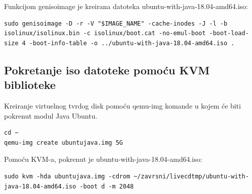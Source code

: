 \documentclass[12pt,vi]{mitthesis}
\begin{document}
\noindent
Funkcijom genisoimage je kreirana datoteka ubuntu-with-java-18.04-amd64.iso:
\begin{lstlisting}[style=BashInputStyle]
sudo genisoimage -D -r -V "$IMAGE_NAME" -cache-inodes -J -l -b isolinux/isolinux.bin -c isolinux/boot.cat -no-emul-boot -boot-load-size 4 -boot-info-table -o ../ubuntu-with-java-18.04-amd64.iso .
\end{lstlisting}

\subsection*{Pokretanje iso datoteke pomoću KVM biblioteke}
\indent
Kreiranje virtuelnog tvrdog disk pomoću qemu-img komande u kojem će biti pokrenut modul Java Ubuntu.
\begin{lstlisting}[style=BashInputStyle]
cd ~
qemu-img create ubuntujava.img 5G
\end{lstlisting}

\noindent 
Pomoću KVM-a, pokrenut je ubuntu-with-java-18.04-amd64.iso:
\begin{lstlisting}[style=BashInputStyle]
sudo kvm -hda ubuntujava.img -cdrom ~/zavrsni/livecdtmp/ubuntu-with-java-18.04-amd64.iso -boot d -m 2048
\end{lstlisting}
\end{document}
